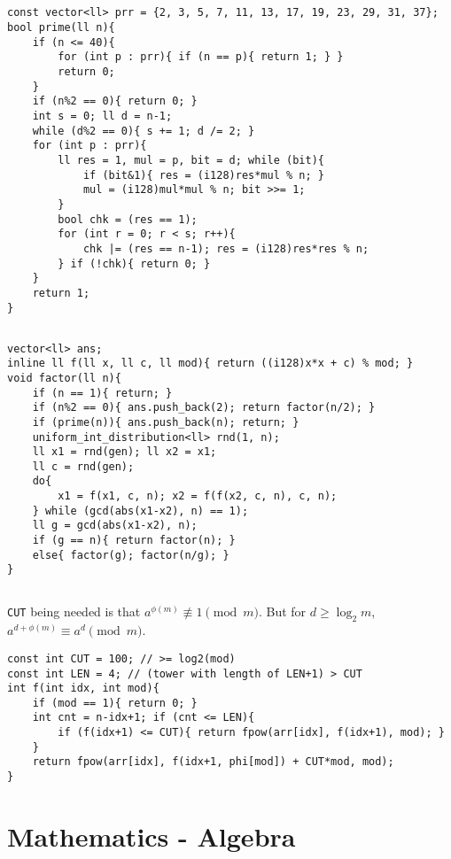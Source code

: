 \documentclass[landscape, 8pt, a4paper, oneside, twocolumn]{extarticle}
\begin{document}
\subsection{}
\begin{verbatim}
const vector<ll> prr = {2, 3, 5, 7, 11, 13, 17, 19, 23, 29, 31, 37};
bool prime(ll n){
    if (n <= 40){
        for (int p : prr){ if (n == p){ return 1; } }
        return 0;
    }
    if (n%2 == 0){ return 0; }
    int s = 0; ll d = n-1;
    while (d%2 == 0){ s += 1; d /= 2; }
    for (int p : prr){
        ll res = 1, mul = p, bit = d; while (bit){
            if (bit&1){ res = (i128)res*mul % n; }
            mul = (i128)mul*mul % n; bit >>= 1;
        }
        bool chk = (res == 1);
        for (int r = 0; r < s; r++){
            chk |= (res == n-1); res = (i128)res*res % n;
        } if (!chk){ return 0; }
    }
    return 1;
}
\end{verbatim}
\subsection{}
\begin{verbatim}
vector<ll> ans;
inline ll f(ll x, ll c, ll mod){ return ((i128)x*x + c) % mod; }
void factor(ll n){
    if (n == 1){ return; }
    if (n%2 == 0){ ans.push_back(2); return factor(n/2); }
    if (prime(n)){ ans.push_back(n); return; }
    uniform_int_distribution<ll> rnd(1, n);
    ll x1 = rnd(gen); ll x2 = x1;
    ll c = rnd(gen);
    do{
        x1 = f(x1, c, n); x2 = f(f(x2, c, n), c, n);
    } while (gcd(abs(x1-x2), n) == 1);
    ll g = gcd(abs(x1-x2), n);
    if (g == n){ return factor(n); }
    else{ factor(g); factor(n/g); }
}
\end{verbatim}
\subsection{}
\texttt{CUT} being needed is that $a^{\phi(m)} \not\equiv 1 \pmod m$. But for $d \ge \log_2 m$, $a^{d+\phi(m)} \equiv a^{d} \pmod m$.
\begin{verbatim}
const int CUT = 100; // >= log2(mod)
const int LEN = 4; // (tower with length of LEN+1) > CUT
int f(int idx, int mod){
    if (mod == 1){ return 0; }
    int cnt = n-idx+1; if (cnt <= LEN){
        if (f(idx+1) <= CUT){ return fpow(arr[idx], f(idx+1), mod); }
    }
    return fpow(arr[idx], f(idx+1, phi[mod]) + CUT*mod, mod);
}
\end{verbatim}
\section{Mathematics - Algebra}
\end{document}
